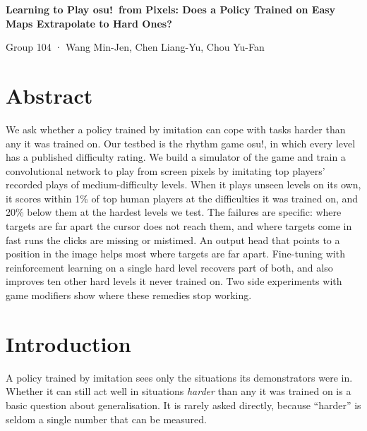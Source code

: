 \documentclass[10pt,a4paper]{article}
\begin{document}
\begin{titlepage}\thispagestyle{empty}\vspace*{2.2cm}\begin{center}{\fontsize{19}{24}\selectfont\bfseries Learning to Play osu!\ from Pixels: Does a Policy Trained on Easy Maps Extrapolate to Hard Ones?\par}\vspace{1.3cm}{\large SC4001 Neural Networks and Deep Learning, Group Project\par}\vspace{0.35cm}
{\large Group 104 · Wang Min-Jen, Chen Liang-Yu, Chou Yu-Fan\par}\vspace{0.35cm}\end{center}\vspace{1.0cm}\end{titlepage}
\newpage\tableofcontents\newpage{}\setcounter{page}{1}

\section*{Abstract}

We ask whether a policy trained by imitation can cope with tasks harder than any it was trained on. Our testbed is the rhythm game osu!, in which every level has a published difficulty rating. We build a simulator of the game and train a convolutional network to play from screen pixels by imitating top players' recorded plays of medium-difficulty levels. When it plays unseen levels on its own, it scores within 1\% of top human players at the difficulties it was trained on, and 20\% below them at the hardest levels we test. The failures are specific: where targets are far apart the cursor does not reach them, and where targets come in fast runs the clicks are missing or mistimed. An output head that points to a position in the image helps most where targets are far apart. Fine-tuning with reinforcement learning on a single hard level recovers part of both, and also improves ten other hard levels it never trained on. Two side experiments with game modifiers show where these remedies stop working.


\section{Introduction}

A policy trained by imitation sees only the situations its demonstrators were in. Whether it can still act well in situations \textit{harder} than any it was trained on is a basic question about generalisation. It is rarely asked directly, because ``harder'' is seldom a single number that can be measured.
\end{document}
